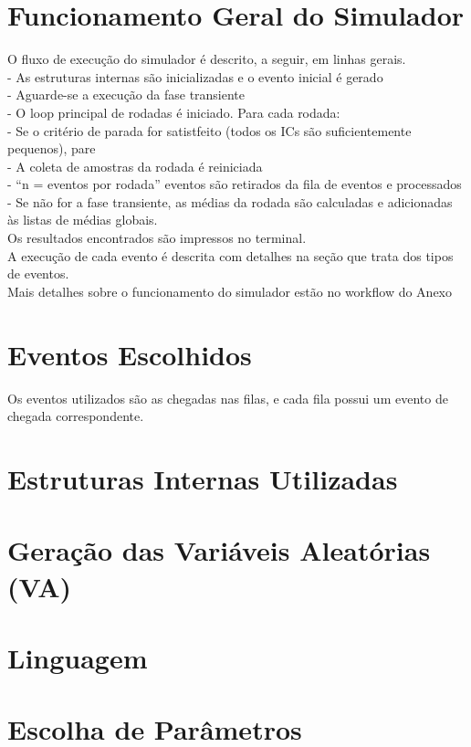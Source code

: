 \documentclass[a4paper,12pt]{report}
\begin{document}
\section{Funcionamento Geral do Simulador}
O fluxo de execução do simulador é descrito, a seguir, em linhas gerais.\\
- As estruturas internas são inicializadas e o evento inicial é gerado\\
- Aguarde-se a execução da fase transiente\\
- O loop principal de rodadas é iniciado. Para cada rodada:\\
- Se o critério de parada for satistfeito (todos os ICs são suficientemente pequenos), pare\\
- A coleta de amostras da rodada é reiniciada\\
- “n = eventos por rodada” eventos são retirados da fila de eventos e processados\\
- Se não for a fase transiente, as médias da rodada são calculadas e adicionadas às listas de médias globais.\\
Os resultados encontrados são impressos no terminal.\\
A execução de cada evento é descrita com detalhes na seção que trata dos tipos de eventos.\\
Mais detalhes sobre o funcionamento do simulador estão no workflow do Anexo %

\section{Eventos Escolhidos}
Os eventos utilizados são as chegadas nas filas, e cada fila possui um evento de chegada correspondente.

\section{Estruturas Internas Utilizadas}

\section{Geração das Variáveis Aleatórias (VA)}

\section{Linguagem}

\section{Escolha de Parâmetros}
\end{document}

